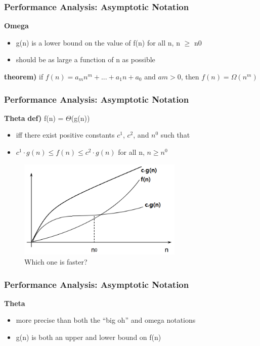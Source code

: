 \documentclass[newPxFont,sthlmFooter,nooffset]{beamer}
\begin{document}
\begin{frame}[t]
  \frametitle{Performance Analysis: Asymptotic Notation}
  \textbf{Omega}
\begin{itemize}
\item g(n) is a lower bound on the value of f(n) for all n, n $\geq$ n0
\item should be as large a function of n as possible
\end{itemize}
\textbf{theorem)} if $f(n) = a_mn^m + ... + a_1n + a_0$ and $am > 0$, then $f(n) = \Omega(n^m)$
\end{frame}
\begin{frame}[t]
  \frametitle{Performance Analysis: Asymptotic Notation}
\textbf{  Theta}
\textbf{def)} f(n) =  $\Theta$(g(n))
\begin{itemize}
\item iff there exist positive constants $c^1$, $c^2$, and $n^0$ such that
\item $c^1\cdot g(n) \leq f(n) \leq c^2\cdot g(n)$ for all n, $n\geq n^0$
\end{itemize}
\begin{figure}[h]
	\centering
	\includegraphics[width=0.7\textwidth]{figures/fig05_theta.png}
	\caption{Which one is faster?}
\end{figure}

\end{frame}

\begin{frame}[t]
	\frametitle{Performance Analysis: Asymptotic Notation}
	\textbf{  Theta}	
	\begin{itemize}
		\item  more precise than both the “big oh” and omega notations
		\item g(n) is both an upper and lower bound on f(n)
	\end{itemize}
	
\end{frame}
\end{document}
